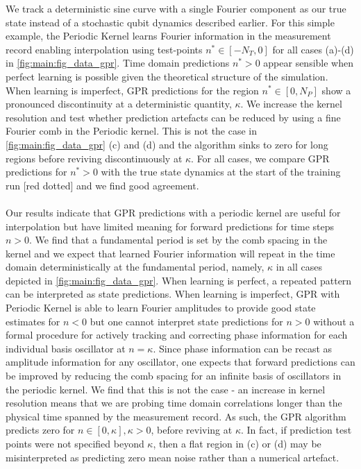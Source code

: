 We track a deterministic sine curve with a single Fourier component as our true state instead of a stochastic qubit dynamics described earlier. For this simple example, the Periodic Kernel learns Fourier information in the measurement record enabling interpolation using test-points $n^* \in [-N_T, 0]$ for all cases (a)-(d) in \cref{fig:main:fig_data_gpr}. Time domain predictions $n^* >0$ appear sensible when perfect learning is possible given the theoretical structure of the simulation. When learning is imperfect, GPR predictions for the region  $n^* \in [0, N_P]$ show a pronounced discontinuity at a deterministic quantity, $\kappa$.  We increase the kernel resolution and test whether prediction artefacts can be reduced by using a fine Fourier comb in the Periodic kernel. This is not the case in \cref{fig:main:fig_data_gpr} (c) and (d) and the algorithm sinks to zero for long regions before reviving discontinuously at $\kappa$. For all cases, we compare GPR predictions for $n^*>0$ with the true state dynamics at the start of the training run [red dotted] and we find good agreement. 
\\
\\
Our results indicate that GPR predictions with a periodic kernel are useful for interpolation but have limited meaning for forward predictions  for time steps $n >0$.  We find that a fundamental period is set by the comb spacing in the kernel and we expect that learned Fourier information will repeat in the time domain deterministically at the fundamental period, namely, $\kappa$ in all cases depicted in \cref{fig:main:fig_data_gpr}. When learning is perfect, a repeated pattern can be interpreted as state predictions. When learning is imperfect,  GPR  with Periodic Kernel is able to learn Fourier amplitudes to provide good state estimates for $n<0$ but one cannot interpret state predictions for $n>0$ without a formal procedure for actively tracking and correcting phase information for each individual basis oscillator at $n= \kappa$. Since phase information can be recast as amplitude information for any oscillator, one expects that forward predictions can be improved by reducing the comb spacing for an infinite basis of oscillators in the periodic kernel.  We find that this is not the case - an increase in kernel resolution means that we are probing time domain correlations longer than the physical time spanned by the measurement record. As such, the GPR algorithm predicts zero for $n \in [0, \kappa], \kappa > 0$, before reviving at $\kappa$.  In fact, if prediction test points were not specified beyond $\kappa$, then a flat region in (c) or (d) may be misinterpreted as predicting zero mean noise rather than a numerical artefact.

